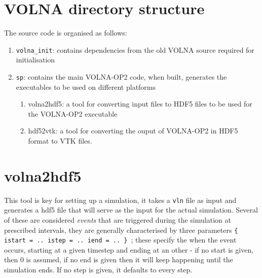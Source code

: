 \documentclass[11pt]{article}
\begin{document}
\section{VOLNA directory structure}
The source code is organised as follows:
\begin{enumerate}
\item \texttt{volna\_init}: contains dependencies from the old VOLNA source required for initialisation
\item \texttt{sp}: contains the main VOLNA-OP2 code, when built, generates the executables to be used on different platforms
\begin{enumerate}
\item{volna2hdf5}: a tool for converting input files to HDF5 files to be used for the VOLNA-OP2 executable
\item{hdf52vtk}: a tool for converting the ouput of VOLNA-OP2 in HDF5 format to VTK files.
\end{enumerate}
\end{enumerate}

\section{volna2hdf5}
This tool is key for setting up a simulation, it takes a \texttt{vln} file as input and generates a hdf5 file that will serve as the input for the actual simulation. Several of these are considered \emph{events} that are triggered during the simulation at prescribed intervals, they are generally characterised by three parameters {\tt \{ istart = .. istep = .. iend = .. \} }; these specify the when the event occurs, starting at a given timestep and ending at an other - if no start is given, then 0 is assumed, if no end is given then it will keep happening until the simulation ends. If no step is given, it defaults to every step. 
\end{document}
